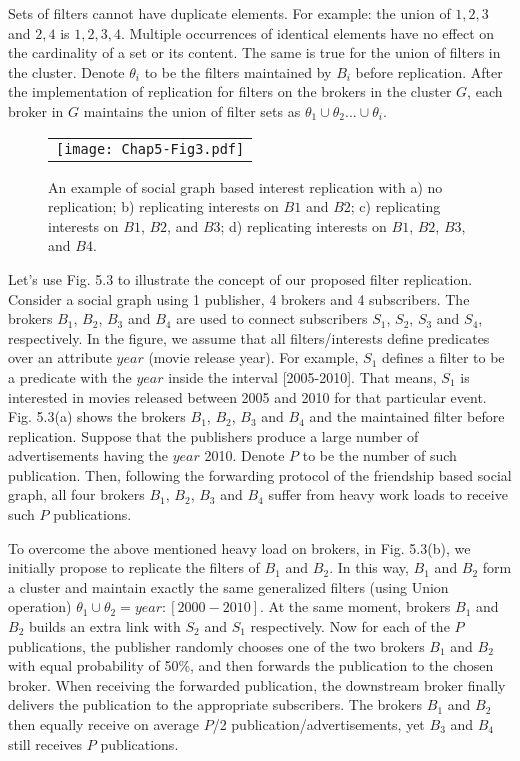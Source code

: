 Sets of filters cannot have duplicate elements. For example: the union of ${1,2,3}$ and ${2,4}$ is ${1,2,3,4}$. Multiple occurrences of identical elements have no effect on the cardinality of a set or its content. The same is true for the union of filters in the cluster. Denote $\theta_i$ to be the filters maintained by $B_i$ before replication. After the implementation of replication for filters on the brokers in the cluster $G$, each broker in $G$ maintains the union of filter sets as $\theta_1 \cup \theta_2 ... \cup \theta_i$.

\begin{figure}[h]
\begin{center}
  \begin{tabular}{c}
  \texttt{[image: Chap5-Fig3.pdf]}
  \end{tabular}
  \caption{An example of social graph based interest replication with a) no replication; b) replicating interests on $B1$ and $B2$; c) replicating interests on $B1$, $B2$, and $B3$; d) replicating interests on $B1$, $B2$, $B3$, and $B4$.}
\end{center}
\end{figure}

Let's use Fig. 5.3 to illustrate the concept of our proposed filter replication. Consider a social graph using 1 publisher, 4 brokers and 4 subscribers. The brokers $B_1$, $B_2$, $B_3$ and $B_4$ are used to connect subscribers $S_1$, $S_2$, $S_3$ and $S_4$, respectively. In the figure, we assume that all filters/interests define predicates over an attribute $year$ (movie release year). For example, $S_1$ defines a filter to be a predicate with the $year$ inside the interval [2005-2010]. That means, $S_1$ is interested in movies released between 2005 and 2010 for that particular event. Fig. 5.3(a) shows the brokers $B_1$, $B_2$, $B_3$ and $B_4$ and the maintained filter before replication. Suppose that the publishers produce a large number of advertisements having the $year$ 2010. Denote $P$ to be the number of such publication. Then, following the forwarding protocol of the friendship based social graph, all four brokers $B_1$, $B_2$, $B_3$ and $B_4$ suffer from heavy work loads to receive such $P$ publications.

To overcome the above mentioned heavy load on brokers, in Fig. 5.3(b), we initially propose to replicate the filters of $B_1$ and $B_2$. In this way, $B_1$ and $B_2$ form a cluster and maintain exactly the same generalized filters (using Union operation) $\theta_1 \cup \theta_2 = {year: [2000-2010]}$. At the same moment, brokers $B_1$ and $B_2$ builds an extra link with $S_2$ and $S_1$ respectively. Now for each of the $P$ publications, the publisher randomly chooses one of the two brokers $B_1$ and $B_2$ with equal probability of 50\%, and then forwards the publication to the chosen broker. When receiving the forwarded publication, the downstream broker finally delivers the publication to the appropriate subscribers. The brokers $B_1$ and $B_2$ then equally receive on average $P$/2 publication/advertisements, yet $B_3$ and $B_4$ still receives $P$ publications.

